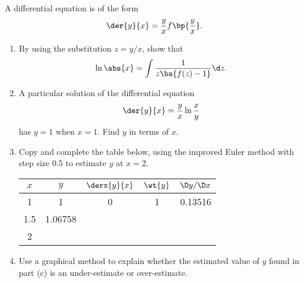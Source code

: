 \begin{problem}
    A differential equation is of the form \[\der{y}{x} = \frac{y}{x} {f\bp{\frac{y}{x}}}.\]

    \begin{enumerate}
        \item By using the substitution $z = y/x$, show that \[\ln \abs{x} = \int \frac1{z\bs{f(z) - 1}} \d z.\]
        \item A particular solution of the differential equation \[\der{y}{x} = \frac{y}{x} \ln{\frac{x}{y}}\] has $y = 1$ when $x = 1$. Find $y$ in terms of $x$.
        \item Copy and complete the table below, using the improved Euler method with step size $0.5$ to estimate $y$ at $x = 2$.
        \begin{table}[H]
            \centering
            \begin{tabular}{|c|c|c|c|c|}
            \hline
            $x$ & $y$ & $\derx{y}{x}$ & $\wt{y}$ & $\D y / \D x$ \\ \hline\hline
            1 & 1 & 0 & 1 & 0.13516 \\ \hline
            1.5 & 1.06758 & & & \\ \hline
            2 & & \cellcolor{black!10} & \cellcolor{black!10} &  \cellcolor{black!10} \\ \hline
            \end{tabular}
        \end{table}
        \item Use a graphical method to explain whether the estimated value of $y$ found in part (c) is an under-estimate or over-estimate.
    \end{enumerate}
\end{problem}


